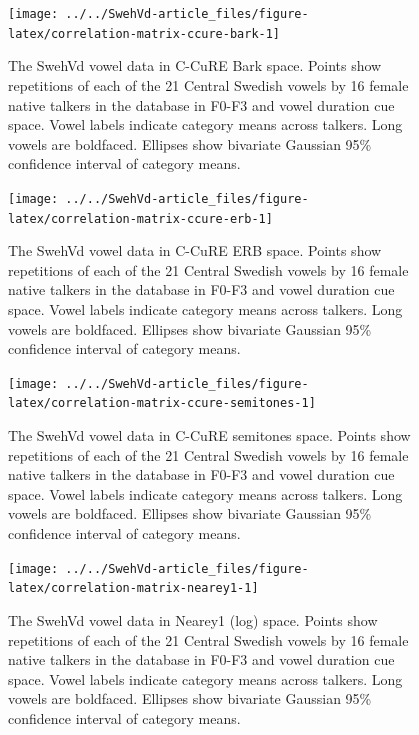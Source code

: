 \documentclass[utf8]{frontiers_suppmat} %
\begin{document}
\begin{figure}
\texttt{[image: ../../SwehVd-article\_files/figure-latex/correlation-matrix-ccure-bark-1]} \caption{The SwehVd vowel data in C-CuRE Bark space. Points show repetitions of each of the 21 Central Swedish vowels by 16 female native talkers in the database in F0-F3 and vowel duration cue space. Vowel labels indicate category means across talkers. Long vowels are boldfaced. Ellipses show bivariate Gaussian 95\% confidence interval of category means.}\label{fig:correlation-matrix-ccure-bark}
\end{figure}



\begin{figure}
\texttt{[image: ../../SwehVd-article\_files/figure-latex/correlation-matrix-ccure-erb-1]} \caption{The SwehVd vowel data in C-CuRE ERB space. Points show repetitions of each of the 21 Central Swedish vowels by 16 female native talkers in the database in F0-F3 and vowel duration cue space. Vowel labels indicate category means across talkers. Long vowels are boldfaced. Ellipses show bivariate Gaussian 95\% confidence interval of category means.}\label{fig:correlation-matrix-ccure-erb}
\end{figure}



\begin{figure}
\texttt{[image: ../../SwehVd-article\_files/figure-latex/correlation-matrix-ccure-semitones-1]} \caption{The SwehVd vowel data in C-CuRE semitones space. Points show repetitions of each of the 21 Central Swedish vowels by 16 female native talkers in the database in F0-F3 and vowel duration cue space. Vowel labels indicate category means across talkers. Long vowels are boldfaced. Ellipses show bivariate Gaussian 95\% confidence interval of category means.}\label{fig:correlation-matrix-ccure-semitones}
\end{figure}



\begin{figure}
\texttt{[image: ../../SwehVd-article\_files/figure-latex/correlation-matrix-nearey1-1]} \caption{The SwehVd vowel data in Nearey1 (log) space. Points show repetitions of each of the 21 Central Swedish vowels by 16 female native talkers in the database in F0-F3 and vowel duration cue space. Vowel labels indicate category means across talkers. Long vowels are boldfaced. Ellipses show bivariate Gaussian 95\% confidence interval of category means.}\label{fig:correlation-matrix-nearey1}
\end{figure}
\end{document}
